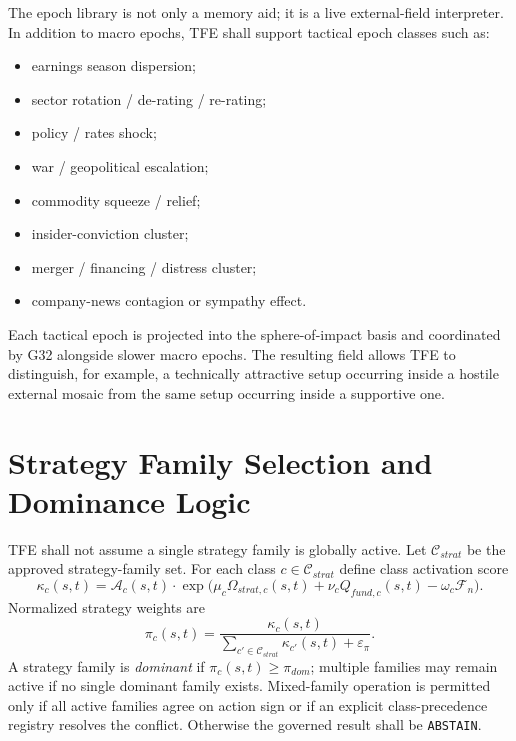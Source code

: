 The epoch library is not only a memory aid; it is a live external-field interpreter. In addition to macro epochs, TFE shall support tactical epoch classes such as:
\begin{itemize}
    \item earnings season dispersion;
    \item sector rotation / de-rating / re-rating;
    \item policy / rates shock;
    \item war / geopolitical escalation;
    \item commodity squeeze / relief;
    \item insider-conviction cluster;
    \item merger / financing / distress cluster;
    \item company-news contagion or sympathy effect.
\end{itemize}
Each tactical epoch is projected into the sphere-of-impact basis and coordinated by G32 alongside slower macro epochs. The resulting field allows TFE to distinguish, for example, a technically attractive setup occurring inside a hostile external mosaic from the same setup occurring inside a supportive one.


\section{Strategy Family Selection and Dominance Logic}

TFE shall not assume a single strategy family is globally active. Let $\mathcal{C}_{strat}$ be the approved strategy-family set. For each class $c\in\mathcal{C}_{strat}$ define class activation score
\[
\kappa_c(s,t)=\mathcal{A}_c(s,t)\cdot \exp\big(\mu_c\Omega_{strat,c}(s,t)+\nu_c Q_{fund,c}(s,t)-\omega_c\mathcal{F}_n\big).
\]
Normalized strategy weights are
\[
\pi_c(s,t)=\frac{\kappa_c(s,t)}{\sum_{c'\in\mathcal{C}_{strat}}\kappa_{c'}(s,t)+\varepsilon_{\pi}}.
\]
A strategy family is \emph{dominant} if $\pi_c(s,t)\ge \pi_{dom}$; multiple families may remain active if no single dominant family exists. Mixed-family operation is permitted only if all active families agree on action sign or if an explicit class-precedence registry resolves the conflict. Otherwise the governed result shall be \texttt{ABSTAIN}.

